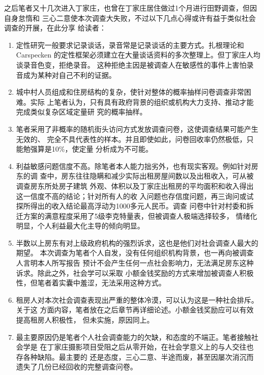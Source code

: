 之后笔者又十几次进入丁家庄，也曾在丁家庄居住做过1个月进行田野调查，但因自身怠惰和
三心二意使本次调查大失败，不过以下几点心得或许有益于类似社会调查的开展，在此分享
给读者：
\begin{enumerate}
 
\item 定性研究一般要求记录谈话，录音常是记录谈话的主要方式。扎根理论和Carspecken
的定性框架必须建立在大量谈话资料的多次整理上。但丁家庄人均谈录音色变，拒绝录音。
这种拒绝主因是被调查人在敏感性的事件上害怕录音成为某种对自己不利的证据。

\item 城中村人员组成和住房结构的复杂，使针对整体的概率抽样问卷调查非常困难。实际
上笔者认为，只有具有政府背景的组织或机构大力支持、推动才能完成类似复杂区域定量研
究的概率抽样。

\item 笔者采用了非概率的随机街头访问方式发放调查问卷，这使调查结果可能产生无效的、
完全不具代表性的样本。并且即使如此，问卷回收率仍然极低，只能勉强算是10\%，使定量
分析成为不可能。

\item 利益敏感问题信度不高。除笔者本人能力拙劣外，也有现实客观。例如针对房东的调
查中，房东往往隐瞒和减少实际出租房屋间数以及出租收入，可从被调查房东所处房子建筑
外观、体积以及丁家庄出租房的平均面积和收入得出这一信度不高的结论；针对所有人的收
入问题也存信度问题，再三询问或试探所得出的收入结论最高浮动为1000多元人民币。调查
问卷中针对村委和拆迁方案的满意程度采用了5级李克特量表，但被调查人极端选择较多，
情绪化明显，个人利益最大化主导的倾向明显。

\item 半数以上房东有对上级政府机构的强烈诉求，这也是他们对社会调查人最大的期望。
  本次调查为笔者个人自发，没有任何组织机构背景，也一再向被调查人言明本人所写报告
  预计不会产生任何一点社会影响力，无法满足房东这种诉求。除此之外，社会学可以采取
  小额金钱奖励的方式来增加被调查人积极性，但笔者着实囊中羞涩，无法采用这种方式。

\item 租房人对本次社会调查表现出严重的整体冷漠，可以认为这是一种社会排斥。关于这
  方面内容，笔者放在之后章节再详细论述。小额金钱奖励应可以有效提高租房人积极性，
  但未实施，原因同上。

\item 最主要原因仍是笔者个人社会调查能力的欠缺，和态度的不端正。笔者接触社会学是
在丁家庄摄影项目受阻之后从零开始，在社会学意义上的与人交往也存各种缺陷。最主要的
还是态度，三心二意、半途而废，甚至因屡次消沉而遗失了几份已经回收的完整调查问卷。

\end{enumerate}

